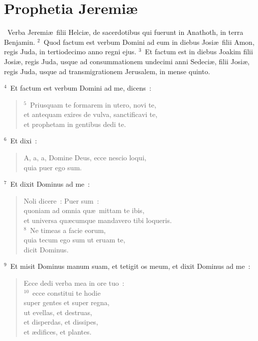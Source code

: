 {\centering \section*{Prophetia Jeremiæ}}\thispagestyle{empty}

~Verba Jeremi\ae\ filii Helci\ae , de sacerdotibus qui fuerunt in Anathoth, in terra Benjamin.
${}^{2}$~Quod factum est verbum Domini ad eum in diebus Josi\ae\ filii Amon, regis Juda, in tertiodecimo anno regni ejus.
${}^{3}$~Et factum est in diebus Joakim filii Josi\ae , regis Juda, usque ad consummationem undecimi anni Sedeci\ae , filii Josi\ae , regis Juda, usque ad transmigrationem Jerusalem, in mense quinto.


${}^{4}$~Et factum est verbum Domini ad me, dicens~:
\begin{flushleft}\begin{verse}${}^{5}$~Priusquam te formarem in utero, novi te,\\ et antequam exires de vulva, sanctificavi te,\\ et prophetam in gentibus dedi te.\end{verse}\end{flushleft}


${}^{6}$~Et dixi~: \begin{flushleft}\begin{verse}A, a, a, Domine Deus, ecce nescio loqui,\\ quia puer ego sum.\end{verse}\end{flushleft}


${}^{7}$~Et dixit Dominus ad me~: \begin{flushleft}\begin{verse}Noli dicere~: Puer sum~:\\ quoniam ad omnia qu\ae\ mittam te ibis,\\ et universa qu\ae cumque mandavero tibi loqueris.\\
${}^{8}$~Ne timeas a facie eorum,\\ quia tecum ego sum ut eruam te,\\ dicit Dominus.\end{verse}\end{flushleft}


${}^{9}$~Et misit Dominus manum suam, et tetigit os meum, et dixit Dominus ad me~: \begin{flushleft}\begin{verse}Ecce dedi verba mea in ore tuo~:\\
${}^{10}$~ecce constitui te hodie\\ super gentes et super regna,\\ ut evellas, et destruas,\\ et disperdas, et dissipes,\\ et \ae difices, et plantes.\end{verse}\end{flushleft}



